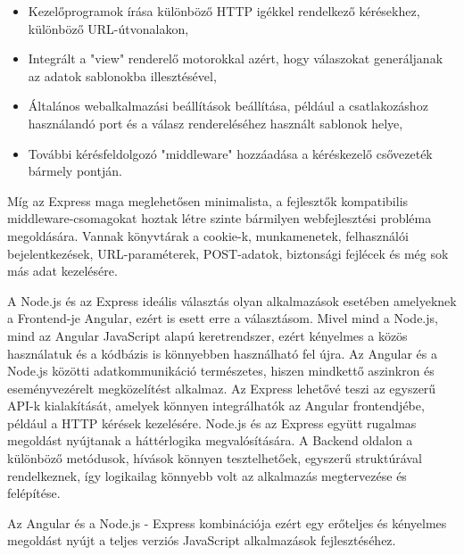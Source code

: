 \begin{itemize}
\item Kezelőprogramok írása különböző HTTP igékkel rendelkező kérésekhez, különböző URL-útvonalakon,
\item Integrált a "view" renderelő motorokkal azért, hogy válaszokat generáljanak az adatok sablonokba illesztésével,
\item Általános webalkalmazási beállítások beállítása, például a csatlakozáshoz használandó port és a válasz rendereléséhez használt sablonok helye,
\item További kérésfeldolgozó "middleware" hozzáadása a kéréskezelő csővezeték bármely pontján.
\end{itemize}


Míg az Express maga meglehetősen minimalista, a fejlesztők kompatibilis middleware-csomagokat hoztak létre szinte bármilyen webfejlesztési probléma megoldására. Vannak könyvtárak a cookie-k, munkamenetek, felhasználói bejelentkezések, URL-paraméterek, POST-adatok, biztonsági fejlécek és még sok más adat kezelésére.\newline

A Node.js és az Express ideális választás olyan alkalmazások esetében amelyeknek a Frontend-je Angular, ezért is esett erre a választásom. Mivel mind a Node.js, mind az Angular JavaScript alapú keretrendszer, ezért kényelmes a közös használatuk és a kódbázis is könnyebben használható fel újra.  Az Angular és a Node.js közötti adatkommunikáció természetes, hiszen mindkettő aszinkron és eseményvezérelt megközelítést alkalmaz. Az Express lehetővé teszi az egyszerű API-k kialakítását, amelyek könnyen integrálhatók az Angular frontendjébe, például a HTTP kérések kezelésére. Node.js és az Express együtt rugalmas megoldást nyújtanak a háttérlogika megvalósítására. A Backend oldalon a különböző metódusok, hívások könnyen tesztelhetőek, egyszerű struktúrával rendelkeznek, így logikailag könnyebb volt az alkalmazás megtervezése és felépítése. 

Az Angular és a Node.js - Express kombinációja ezért egy erőteljes és kényelmes megoldást nyújt a teljes verziós JavaScript alkalmazások fejlesztéséhez. 
\cite{Node}
